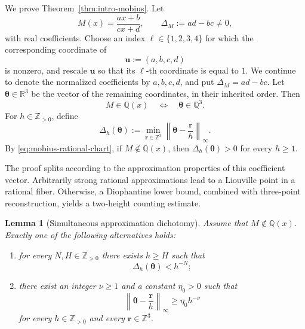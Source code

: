\documentclass[11pt]{amsart}
\numberwithin{equation}{section}
\newtheorem{lemma}[lemma]{Lemma}
\theoremstyle{definition}
\theoremstyle{remark}
\newcommand{\R}{\mathbb R}
\newcommand{\Q}{\mathbb Q}
\newcommand{\Z}{\mathbb Z}
\begin{document}
We prove Theorem~\ref{thm:intro-mobius}. Let
\begin{equation}\label{eq:mobius-map}
M(x)=\frac{ax+b}{cx+d},
\qquad
\Delta_M:=ad-bc\neq0,
\end{equation}
with real coefficients. Choose an index
$\ell\in\{1,2,3,4\}$ for which the corresponding coordinate of
\[
\mathbf u:=(a,b,c,d)
\]
is nonzero, and rescale \(\mathbf u\) so that its \(\ell\)-th coordinate
is equal to \(1\). We continue to denote the normalized coefficients by
\(a,b,c,d\), and put \(\Delta_M=ad-bc\).
Let \(\boldsymbol\theta\in\R^3\) be the vector of the remaining
coordinates, in their inherited order. Then
\begin{equation}\label{eq:mobius-rational-chart}
M\in\Q(x)
\quad\Longleftrightarrow\quad
\boldsymbol\theta\in\Q^3.
\end{equation}
For \(h\in\Z_{>0}\), define
\begin{equation}\label{eq:mobius-Delta}
\Delta_h(\boldsymbol\theta)
:=
\min_{\mathbf r\in\Z^3}
\left\|\boldsymbol\theta-\frac{\mathbf r}{h}\right\|_\infty.
\end{equation}
By \eqref{eq:mobius-rational-chart}, if \(M\notin\Q(x)\), then
\(\Delta_h(\boldsymbol\theta)>0\) for every \(h\geq1\).

The proof splits according to the approximation properties of this
coefficient vector. Arbitrarily strong rational approximations lead to
a Liouville point in a rational fiber. Otherwise, a Diophantine lower
bound, combined with three-point reconstruction, yields a two-height
counting estimate.

\begin{lemma}[Simultaneous approximation dichotomy]
\label{lem:mobius-dichotomy}
Assume that \(M\notin\Q(x)\). Exactly one of the following alternatives
holds:
\begin{enumerate}[label=\textup{(\alph*)},leftmargin=2.7em]
\item for every \(N,H\in\Z_{>0}\) there exists \(h\geq H\) such that
\[
\Delta_h(\boldsymbol\theta)<h^{-N};
\]
\item there exist an integer \(\nu\geq1\) and a constant \(\eta_0>0\)
such that
\begin{equation}\label{eq:mobius-barrier}
\left\|\boldsymbol\theta-\frac{\mathbf r}{h}\right\|_\infty
\geq \eta_0h^{-\nu}
\end{equation}
for every \(h\in\Z_{>0}\) and every \(\mathbf r\in\Z^3\).
\end{enumerate}
\end{lemma}
\end{document}
